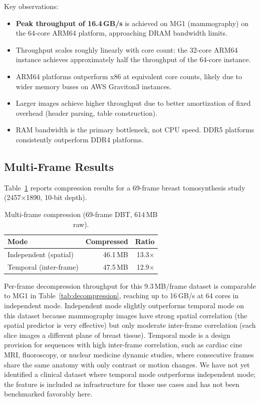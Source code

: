 \documentclass[11pt,twocolumn]{article}
\begin{document}
Key observations:
\begin{itemize}[nosep]
    \item \textbf{Peak throughput of 16.4\,GB/s} is achieved on MG1 (mammography) on the 64-core ARM64 platform, approaching DRAM bandwidth limits.
    \item Throughput scales roughly linearly with core count: the 32-core ARM64 instance achieves approximately half the throughput of the 64-core instance.
    \item ARM64 platforms outperform x86 at equivalent core counts, likely due to wider memory buses on AWS Graviton3 instances.
    \item Larger images achieve higher throughput due to better amortization of fixed overhead (header parsing, table construction).
    \item RAM bandwidth is the primary bottleneck, not CPU speed. DDR5 platforms consistently outperform DDR4 platforms.
\end{itemize}

\subsection{Multi-Frame Results}

Table~\ref{tab:multiframe} reports compression results for a 69-frame breast tomosynthesis study (2457$\times$1890, 10-bit depth).

\begin{table}[t]
\centering
\caption{Multi-frame compression (69-frame DBT, 614\,MB raw).}
\label{tab:multiframe}
\small
\begin{tabular}{@{}lrr@{}}
\toprule
Mode & Compressed & Ratio \\
\midrule
Independent (spatial) & 46.1\,MB & 13.3$\times$ \\
Temporal (inter-frame) & 47.5\,MB & 12.9$\times$ \\
\bottomrule
\end{tabular}
\end{table}

Per-frame decompression throughput for this 9.3\,MB/frame dataset is comparable to MG1 in Table~\ref{tab:decompression}, reaching up to 16\,GB/s at 64 cores in independent mode.
Independent mode slightly outperforms temporal mode on this dataset because mammography images have strong spatial correlation (the spatial predictor is very effective) but only moderate inter-frame correlation (each slice images a different plane of breast tissue).
Temporal mode is a design provision for sequences with high inter-frame correlation, such as cardiac cine MRI, fluoroscopy, or nuclear medicine dynamic studies, where consecutive frames share the same anatomy with only contrast or motion changes.
We have not yet identified a clinical dataset where temporal mode outperforms independent mode; the feature is included as infrastructure for those use cases and has not been benchmarked favorably here.
\end{document}
